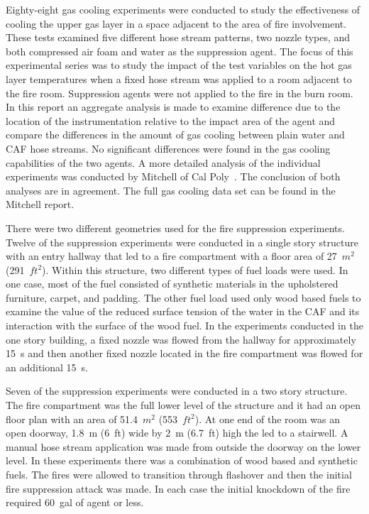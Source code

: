\documentclass[12pt,oneside]{book}
\begin{document}
Eighty-eight gas cooling experiments were conducted to study the effectiveness of cooling the upper gas layer in a space adjacent to the area of fire involvement. These tests examined five different hose stream patterns, two nozzle types, and both compressed air foam and water as the suppression agent. The focus of this experimental series was to study the impact of the test variables on the hot gas layer temperatures when a fixed hose stream was applied to a room adjacent to the fire room. Suppression agents were not applied to the fire in the burn room. In this report an aggregate analysis is made to examine difference due to the location of the instrumentation relative to the impact area of the agent and compare the differences in the amount of gas cooling between plain water and CAF hose streams. No significant differences were found in the gas cooling capabilities of the two agents. A more detailed analysis of the individual experiments was conducted by Mitchell of Cal Poly~\cite{Mitchell:1}. The conclusion of both analyses are in agreement. The full gas cooling data set can be found in the Mitchell report.    

There were two different geometries used for the fire suppression experiments. Twelve of the suppression experiments were conducted in a single story structure with an entry hallway that led to a fire compartment with a floor area of 27~$m^2$ (291~$ft^2$). Within this structure, two different types of fuel loads were used. In one case, most of the fuel consisted of synthetic materials in the upholstered furniture, carpet, and padding. The other fuel load used only wood based fuels to examine the value of the reduced surface tension of the water in the CAF and its interaction with the surface of the wood fuel. In the experiments conducted in the one story building, a fixed nozzle was flowed from the hallway for approximately 15~s and then another fixed nozzle located in the fire compartment was flowed for an additional 15~s.   

Seven of the suppression experiments were conducted in a two story structure.  The fire compartment was the full lower level of the structure and it had an open floor plan with an area of 51.4~$m^2$ (553~$ft^2$). At one end of the room was an open doorway, 1.8~m (6~ft) wide by
2~m (6.7~ft) high the led to a stairwell. A manual hose stream application was made from outside the doorway on the lower level. In these experiments there was a combination of wood based and synthetic fuels. The fires were allowed to transition through flashover and then the initial fire suppression attack was made. In each case the initial knockdown of the fire required 60~gal of agent or less.   
\end{document}
